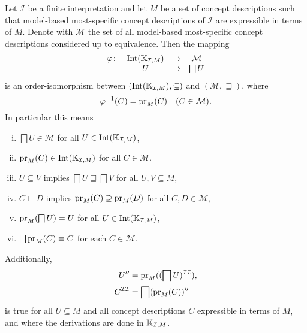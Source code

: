 \begin{Corollary}
  \label{cor:mmsc-lattice}
  Let $\mathcal{I}$ be a finite interpretation and let $M$ be a set of concept
  descriptions such that model-based most-specific concept descriptions of $\mathcal{I}$
  are expressible in terms of $M$.  Denote with $\mathcal{M}$ the set of all model-based
  most-specific concept descriptions considered up to equivalence.  Then the mapping
  \begin{equation*}
    \begin{array}{cccc}
      \varphi \colon & \operatorname{Int}({\mathbb{K}}_{\mathcal{I}, M}) & \to     & \mathcal{M} \\
      ~           & U                         & \mapsto & \bigsqcap U
    \end{array}
  \end{equation*}
  is an order-isomorphism between $(\operatorname{Int}({\mathbb{K}}_{\mathcal{I}, M}), \subseteq)$ and
  $(\mathcal{M}, \sqsupseteq)$, where
  \begin{equation*}
    \varphi^{-1}(C) = \operatorname{pr}_M(C) \quad (C \in \mathcal{M}).
  \end{equation*}
  In particular this means
  \begin{enumerate}[i. ]
  \item\label{item:10} $\bigsqcap U \in \mathcal{M}$ for all $U \in \operatorname{Int}({\mathbb{K}}_{\mathcal{I}, M})$,
  \item\label{item:11} $\operatorname{pr}_M(C) \in \operatorname{Int}({\mathbb{K}}_{\mathcal{I}, M})$ for all $C \in \mathcal{M}$,
  \item\label{item:12} $U \subseteq V$ implies $\bigsqcap U \sqsupseteq \bigsqcap V$ for
    all $U, V \subseteq M$,
  \item\label{item:13} $C \sqsubseteq D$ implies $\operatorname{pr}_M(C) \supseteq \operatorname{pr}_M(D)$ for all $C,
    D \in \mathcal{M}$,
  \item\label{item:14} $\operatorname{pr}_M(\bigsqcap U) = U$ for all $U \in \operatorname{Int}({\mathbb{K}}_{\mathcal{I}, M})$,
  \item\label{item:15} $\bigsqcap \operatorname{pr}_M(C) \equiv C$ for each $C \in \mathcal{M}$.
  \end{enumerate}
  Additionally,
  \begin{equation}
    \label{eq:18}
    \begin{aligned}
      U'' &= \operatorname{pr}_M((\bigsqcap U)^{\mathcal{I}\mathcal{I}}), \\
      C^{\mathcal{I}\mathcal{I}} &= \bigsqcap (\operatorname{pr}_M(C))''
    \end{aligned}
  \end{equation}
  is true for all $U \subseteq M$ and all concept descriptions $C$ expressible in terms of
  $M$, and where the derivations are done in ${\mathbb{K}}_{\mathcal{I}, M}$.
\end{Corollary}
